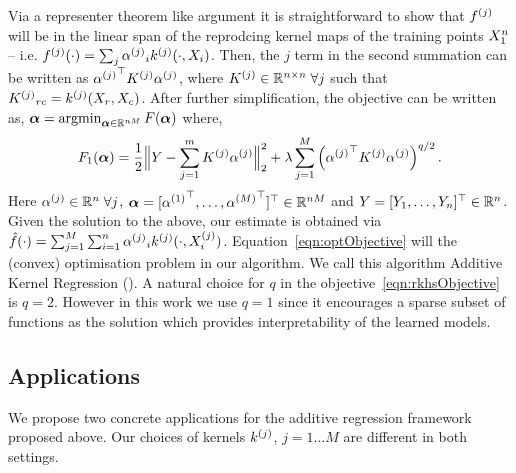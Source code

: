Via a representer theorem like argument it is straightforward to show
that $f^{(j)}$ will be in the linear span of the reprodcing kernel maps of the
training points $X_1^{n}$ -- i.e. $f^{(j)}(\cdot) = 
\sum_j {\alpha^{(j)}}_i k^{(j)}(\cdot, X_i) $.
Then, the $j$ term in the second summation can be written as
${{\alpha^{(j)}}}^\top {K^{(j)}} {\alpha^{(j)}}$,
where ${K^{(j)}} \in \mathbb{R}^{n\times n}\; \forall
j$ such that ${K^{(j)}}_{rc} = k^{(j)}(X_r, X_c)$.
After further simplification, the objective can be written as,
${\bm{\alpha}} = \mathop{\mathrm{argmin}}_{{\bm{\alpha}} \in \mathbb{R}^{nM}} F({\bm{\alpha}})$ where,
\begin{equation}
F_1({\bm{\alpha}}) = \frac{1}{2}\Big\|Y - \sum_{j=1}^m {K^{(j)}} {\alpha^{(j)}}\Big\|_2^2 + 
  \lambda \sum_{j=1}^M \left({{\alpha^{(j)}}}^\top {K^{(j)}} {\alpha^{(j)}}\right)^{q/2}.
\label{eqn:optObjective}
\end{equation}
Here ${\alpha^{(j)}} \in \mathbb{R}^n \; \forall j$, ${\bm{\alpha}} = [{\alpha^{(1)}}^\top, \dots, 
{\alpha^{(M)}}^\top]^\top  \in\mathbb{R}^{nM}$ and $Y = [Y_1, \dots, Y_n]^\top \in
\mathbb{R}^n$. Given the solution to the above, our
estimate is obtained via $\hat{f}(\cdot) = \sum_{j=1}^M \sum_{i=1}^n {\alpha^{(j)}}_i
k^{(j)}(\cdot, X^{(j)}_i)$.
Equation~\eqref{eqn:optObjective} will the (convex) optimisation problem in our
algorithm.
We call this algorithm Additive Kernel Regression (\addkrr).
A natural choice for $q$ in the objective~\eqref{eqn:rkhsObjective} is $q=2$. 
However in
this work we use $q=1$ since it encourages a sparse subset of functions as the
solution which provides interpretability of the learned models. 


\subsection{Applications}

We propose two concrete applications for the additive regression framework
proposed above. Our choices of kernels $k^{(j)}$, $j=1\dots M$ are different
in both settings.


